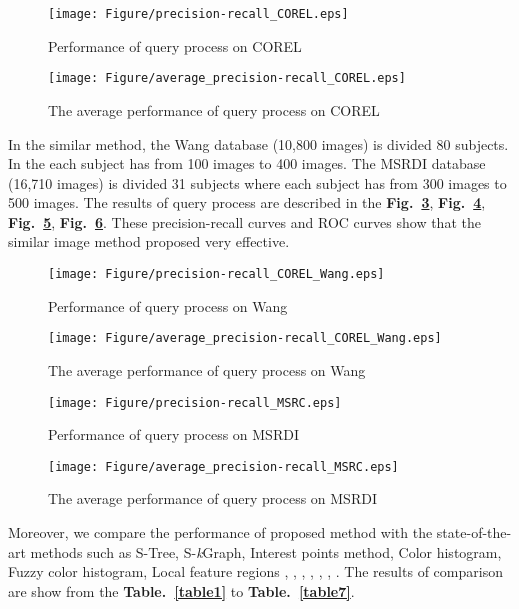 \documentclass{amcs}
\begin{document}
\begin{figure}[!ht]
	\centering
		\texttt{[image: Figure/precision-recall\_COREL.eps]}
		\caption{Performance of query process on COREL}
		\label{fig:CORELper}
\end{figure}

\begin{figure}[!ht]
	\centering
		\texttt{[image: Figure/average\_precision-recall\_COREL.eps]}
		\caption{The average performance of query process on COREL}
		\label{fig:CORELaveper}
\end{figure}

In the similar method, the Wang database (10,800 images) is divided 80 subjects. In the each subject has from 100 images to 400 images. The MSRDI database (16,710 images) is divided 31 subjects where each subject has from 300 images to 500 images. The results of query process are described in the \textbf{Fig.~\ref{fig:CORELWangper}}, \textbf{Fig.~\ref{fig:CORELWangaveper}}, \textbf{Fig.~\ref{fig:MSRCper}}, \textbf{Fig.~\ref{fig:MSRCperave}}. These precision-recall curves and ROC curves show that the similar image method proposed very effective.

\begin{figure}[!ht]
	\centering
		\texttt{[image: Figure/precision-recall\_COREL\_Wang.eps]}
		\caption{Performance of query process on Wang}
		\label{fig:CORELWangper}
\end{figure}

\begin{figure}[!ht]
	\centering
		\texttt{[image: Figure/average\_precision-recall\_COREL\_Wang.eps]}
		\caption{The average performance of query process on Wang}
		\label{fig:CORELWangaveper}
\end{figure}

\begin{figure}[!ht]
	\centering
		\texttt{[image: Figure/precision-recall\_MSRC.eps]}
		\caption{Performance of query process on MSRDI}
		\label{fig:MSRCper}
\end{figure}

\begin{figure}[!ht]
	\centering
		\texttt{[image: Figure/average\_precision-recall\_MSRC.eps]}
		\caption{The average performance of query process on MSRDI}
		\label{fig:MSRCperave}
\end{figure}

Moreover, we compare the performance of proposed method with the state-of-the-art methods such as S-Tree, S-\textit{k}Graph, Interest points method, Color histogram, Fuzzy color histogram, Local feature regions \cite{Wang:10}, \cite{Wang:13}, \cite{Yannis:02}, \cite{Thanh:2013}, \cite{Thanh:2014}, \cite{Thanh:2014a}, \cite{Thanh:2014b}. The results of comparison are show from the \textbf{Table.~\ref{table1}} to \textbf{Table.~\ref{table7}}.
\end{document}
